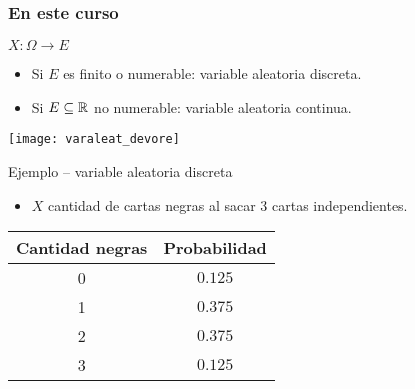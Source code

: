 \documentclass[table]{beamer}
\begin{document}
\begin{frame}
    \frametitle{En este curso}
    \begin{block}{$X : \Omega \rightarrow E$}
        \begin{itemize}
            \item Si $E$ es finito o numerable: variable aleatoria discreta.
            \item Si $E \subseteq \mathbb{R}$ no numerable: variable aleatoria continua.
        \end{itemize}
    \end{block}
    \begin{center}
        \texttt{[image: varaleat\_devore]}
    \end{center}
    \begin{exampleblock}{Ejemplo -- variable aleatoria discreta}
        \begin{itemize}
            \item $X$ cantidad de cartas negras al sacar 3 cartas independientes.
        \end{itemize}
    \begin{center}
        \begin{tabular}{c|c}
            Cantidad negras & Probabilidad \\
            \hline
            0 & $0.125$ \\
            1 & $0.375$ \\
            2 & $0.375$ \\
            3 & $0.125$
        \end{tabular}
    \end{center}
    \end{exampleblock}
\end{frame}


\end{document}
